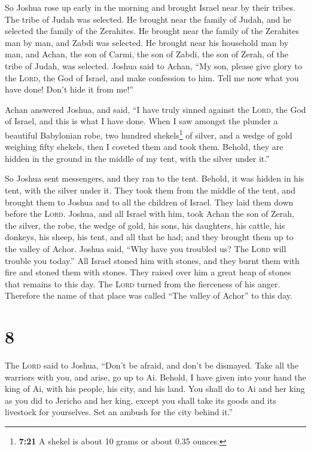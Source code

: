  So Joshua rose up early in the morning and brought
Israel near by their tribes. The tribe of Judah was selected.
 He brought near the family of Judah, and he selected the
family of the Zerahites. He brought near the family of the Zerahites man
by man, and Zabdi was selected.  He brought near his
household man by man, and Achan, the son of Carmi, the son of Zabdi, the
son of Zerah, of the tribe of Judah, was selected. 
Joshua said to Achan, ``My son, please give glory to the \textsc{Lord},
the God of Israel, and make confession to him. Tell me now what you have
done! Don't hide it from me!''

 Achan answered Joshua, and said, ``I have truly sinned
against the \textsc{Lord}, the God of Israel, and this is what I have
done.  When I saw amongst the plunder a beautiful
Babylonian robe, two hundred shekels\footnote{\textbf{7:21} A shekel is
  about 10 grams or about 0.35 ounces.} of silver, and a wedge of gold
weighing fifty shekels, then I coveted them and took them. Behold, they
are hidden in the ground in the middle of my tent, with the silver under
it.''

 So Joshua sent messengers, and they ran to the tent.
Behold, it was hidden in his tent, with the silver under it.
 They took them from the middle of the tent, and brought
them to Joshua and to all the children of Israel. They laid them down
before the \textsc{Lord}.  Joshua, and all Israel with
him, took Achan the son of Zerah, the silver, the robe, the wedge of
gold, his sons, his daughters, his cattle, his donkeys, his sheep, his
tent, and all that he had; and they brought them up to the valley of
Achor.  Joshua said, ``Why have you troubled us? The
\textsc{Lord} will trouble you today.'' All Israel stoned him with
stones, and they burnt them with fire and stoned them with stones.
 They raised over him a great heap of stones that remains
to this day. The \textsc{Lord} turned from the fierceness of his anger.
Therefore the name of that place was called ``The valley of Achor'' to
this day.

\hypertarget{section-7}{%
\section{8}\label{section-7}}

 The \textsc{Lord} said to Joshua, ``Don't be afraid, and
don't be dismayed. Take all the warriors with you, and arise, go up to
Ai. Behold, I have given into your hand the king of Ai, with his people,
his city, and his land.  You shall do to Ai and her king
as you did to Jericho and her king, except you shall take its goods and
its livestock for yourselves. Set an ambush for the city behind it.''

